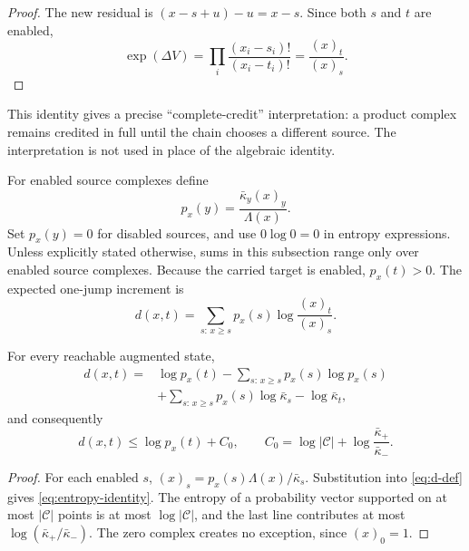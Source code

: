\begin{proof}
The new residual is \((x-s+u)-u=x-s\).  Since both \(s\) and \(t\) are
enabled,
\[
 \exp(\Delta V)
 =\prod_i\frac{(x_i-s_i)!}{(x_i-t_i)!}
 =\frac{(x)_t}{(x)_s}.
\]
\end{proof}

This identity gives a precise ``complete-credit'' interpretation: a product
complex remains credited in full until the chain chooses a different source.
The interpretation is not used in place of the algebraic identity.

For enabled source complexes define
\begin{equation}\label{eq:source-prob}
  p_x(y)=\frac{\bar\kappa_y(x)_y}{\Lambda(x)}.
\end{equation}
Set \(p_x(y)=0\) for disabled sources, and use \(0\log0=0\) in entropy
expressions.  Unless explicitly stated otherwise, sums in this subsection
range only over enabled source complexes.  Because the carried target is
enabled, \(p_x(t)>0\).  The expected one-jump increment is
\begin{equation}\label{eq:d-def}
  d(x,t)=\sum_{s:\,x\ge s}p_x(s)
  \log\frac{(x)_t}{(x)_s}.
\end{equation}

\begin{lemma}\label{lem:entropy}
For every reachable augmented state,
\begin{equation}\label{eq:entropy-identity}
\begin{split}
  d(x,t)
  ={}&\log p_x(t)-\sum_{s:\,x\ge s} p_x(s)\log p_x(s)\\
    &+\sum_{s:\,x\ge s} p_x(s)\log\bar\kappa_s
      -\log\bar\kappa_t,
\end{split}
\end{equation}
and consequently
\begin{equation}\label{eq:entropy-bound}
  d(x,t)\le\log p_x(t)+C_0,
  \qquad
  C_0=\log|\mathcal C|+
  \log\frac{\bar\kappa_+}{\bar\kappa_-}.
\end{equation}
\end{lemma}

\begin{proof}
For each enabled \(s\),
\((x)_s=p_x(s)\Lambda(x)/\bar\kappa_s\).  Substitution into
\eqref{eq:d-def} gives \eqref{eq:entropy-identity}.  The entropy of a
probability vector supported on at most \(|\mathcal C|\) points is at most
\(\log|\mathcal C|\), and the last line contributes at most
\(\log(\bar\kappa_+/\bar\kappa_-)\).  The zero complex creates no exception,
since \((x)_0=1\).
\end{proof}

